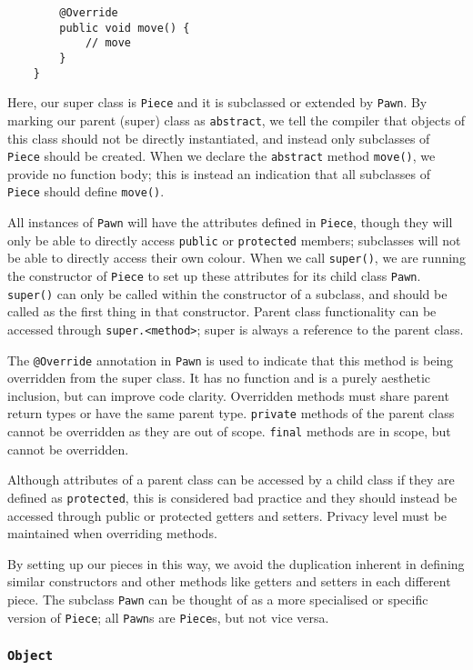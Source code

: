 \documentclass[12pt]{report}
\newcommand{\code}[1]{\lstinline{#1}}
\begin{document}
\begin{flushleft}
\begin{lstlisting}
        @Override    
        public void move() {
            // move
        }
    }
\end{lstlisting}

Here, our super class is \code{Piece} and it is subclassed or extended by
\code{Pawn}. By marking our parent (super) class as \code{abstract}, we tell
the compiler that objects of this class should not be directly instantiated,
and instead only subclasses of \code{Piece} should be created. When we declare
the \code{abstract} method \code{move()}, we provide no function body; this is
instead an indication that all subclasses of \code{Piece} should define
\code{move()}. \par
All instances of \code{Pawn} will have the attributes defined in \code{Piece},
though they will only be able to directly access \code{public} or
\code{protected} members; subclasses will not be able to directly access their
own colour. When we call \code{super()}, we are running the constructor of
\code{Piece} to set up these attributes for its child class \code{Pawn}.
\code{super()} can only be called within the constructor of a subclass, and
should be called as the first thing in that constructor. Parent class 
functionality can be accessed through \code{super.<method>}; super is always
a reference to the parent class. \par
The \code{@Override} annotation in \code{Pawn} is used to indicate that this
method is being overridden from the super class. It has no function and is a
purely aesthetic inclusion, but can improve code clarity. Overridden methods
must share parent return types or have the same parent type. \code{private}
methods of the parent class cannot be overridden as they are out of scope.
\code{final} methods are in scope, but cannot be overridden. \par
Although attributes of a parent class can be accessed by a child class if they
are defined as \code{protected}, this is considered bad practice and they
should instead be accessed through public or protected getters and setters.
Privacy level must be maintained when overriding methods. \par
By setting up our pieces in this way, we avoid the duplication inherent in
defining similar constructors and other methods like getters and setters in
each different piece. The subclass \code{Pawn} can be thought of as a more
specialised or specific version of \code{Piece}; all \code{Pawn}s are
\code{Piece}s, but not vice versa.

\subsubsection*{\code{Object}}


\end{flushleft}
\end{document}
